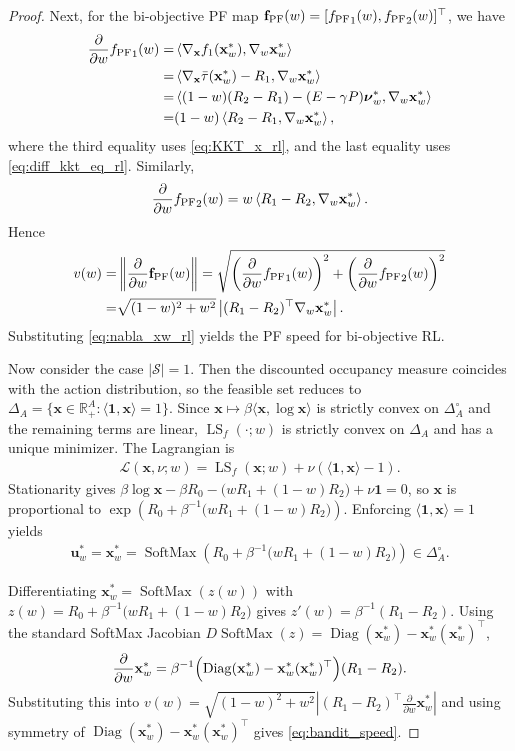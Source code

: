 \documentclass{article}
\newcommand{\bx}{\mathbf{x}}
\newcommand{\bu}{\mathbf{u}}
\newcommand{\LS}{\operatorname{LS}}
\newcommand{\fPF}{{\mathbf{f}_{\rm PF}}}
\newcommand{\Diag}{\operatorname{Diag}}
\newcommand{\SoftMax}{\operatorname{SoftMax}}
\begin{document}
\begin{proof}
Next, for the bi-objective PF map $\fPF(w)=[{f_{\rm PF}}_1(w),{f_{\rm PF}}_2(w)]^\top$, we have
\begin{align}
\frac{\partial}{\partial w}{f_{\rm PF}}_1(w)
=& \left\langle\nabla_{\bx} f_1(\bx_w^*),\nabla_w\bx_w^*\right\rangle \nonumber\\
=& \left\langle\nabla_{\bx}\bar\tau(\bx_w^*)-R_1,\nabla_w\bx_w^*\right\rangle \nonumber\\
=& \left\langle(1-w)(R_2-R_1)-(E-\gamma P)\boldsymbol{\nu}_w^*,\nabla_w\bx_w^*\right\rangle \nonumber\\
=& (1-w)\left\langle R_2-R_1,\nabla_w\bx_w^*\right\rangle,
\label{eq:df1dw_rl}
\end{align}
where the third equality uses \eqref{eq:KKT_x_rl}, and the last equality uses \eqref{eq:diff_kkt_eq_rl}. Similarly,
\begin{align}
\frac{\partial}{\partial w}{f_{\rm PF}}_2(w)
=
w\left\langle R_1-R_2,\nabla_w\bx_w^*\right\rangle .
\end{align}
Hence
\begin{align}
v(w)
=& \left\|\frac{\partial}{\partial w}\fPF(w)\right\| =\sqrt{\left(\frac{\partial}{\partial w}{f_{\rm PF}}_1(w)\right)^2+\left(\frac{\partial}{\partial w}{f_{\rm PF}}_2(w)\right)^2} \nonumber\\
=& \sqrt{(1-w)^2+w^2}\left|(R_1-R_2)^\top\nabla_w\bx_w^*\right|.
\end{align}
Substituting \eqref{eq:nabla_xw_rl} yields the PF speed for bi-objective RL.

Now consider the case $|\mathcal S|=1$. Then the discounted occupancy measure coincides with the action distribution, so the feasible set reduces to $\Delta_A=\{\bx\in\mathbb R_+^A:\langle\mathbf 1,\bx\rangle=1\}$.
Since $\bx\mapsto\beta\langle\bx,\log\bx\rangle$ is strictly convex on $\Delta_A^\circ$ and the remaining terms are linear, $\LS_f(\cdot;w)$ is strictly convex on $\Delta_A$ and has a unique minimizer. 
The Lagrangian is
\begin{align*}
\mathcal L(\bx,\nu;w)=\LS_f(\bx;w)+\nu(\langle\mathbf 1,\bx\rangle-1).
\end{align*}
Stationarity gives $\beta\log\bx-\beta R_0-\bigl(wR_1+(1-w)R_2\bigr)+\nu\mathbf 1=0$, so $\bx$ is proportional to $\exp\left(R_0+\beta^{-1}\bigl(wR_1+(1-w)R_2\bigr)\right)$. Enforcing $\langle\mathbf 1,\bx\rangle=1$ yields
\begin{align}
\bu_w^*=\bx_w^*=\SoftMax\left(R_0+\beta^{-1}\bigl(wR_1+(1-w)R_2\bigr)\right)\in\Delta_A^\circ .
\end{align}

Differentiating $\bx_w^*=\SoftMax(z(w))$ with $z(w)=R_0+\beta^{-1}\bigl(wR_1+(1-w)R_2\bigr)$ gives $z'(w)=\beta^{-1}(R_1-R_2)$. Using the standard SoftMax Jacobian $D\SoftMax(z)=\Diag(\bx_w^*)-\bx_w^*(\bx_w^*)^\top$, 
\begin{align}
\frac{\partial}{\partial w}\bx_w^*
=
\beta^{-1}\Bigl(\Diag(\bx_w^*)-\bx_w^*(\bx_w^*)^\top\Bigr)(R_1-R_2).
\end{align}
Substituting this into $v(w)=\sqrt{(1-w)^2+w^2}\left|(R_1-R_2)^\top\frac{\partial}{\partial w}\bx_w^*\right|$ and using symmetry of $\Diag(\bx_w^*)-\bx_w^*(\bx_w^*)^\top$ gives \eqref{eq:bandit_speed}.
\end{proof}
\end{document}
